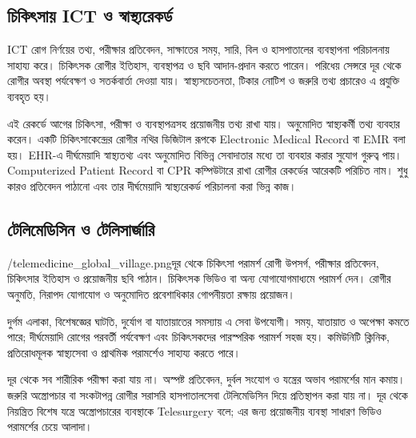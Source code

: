 \begin{topicbody}
\subsection{চিকিৎসায় ICT ও স্বাস্থ্যরেকর্ড}
ICT রোগ নির্ণয়ের তথ্য, পরীক্ষার প্রতিবেদন, সাক্ষাতের সময়, সারি, বিল ও হাসপাতালের ব্যবস্থাপনা পরিচালনায় সাহায্য করে। চিকিৎসক রোগীর ইতিহাস, ব্যবস্থাপত্র ও ছবি আদান-প্রদান করতে পারেন। পরিধেয় সেন্সরে দূর থেকে রোগীর অবস্থা পর্যবেক্ষণ ও সতর্কবার্তা দেওয়া যায়। স্বাস্থ্যসচেতনতা, টিকার নোটিশ ও জরুরি তথ্য প্রচারেও এ প্রযুক্তি ব্যবহৃত হয়।

এই রেকর্ডে আগের চিকিৎসা, পরীক্ষা ও ব্যবস্থাপত্রসহ প্রয়োজনীয় তথ্য রাখা যায়। অনুমোদিত স্বাস্থ্যকর্মী তথ্য ব্যবহার করেন। একটি চিকিৎসাকেন্দ্রের রোগীর নথির ডিজিটাল রূপকে Electronic Medical Record বা EMR বলা হয়। EHR-এ দীর্ঘমেয়াদি স্বাস্থ্যতথ্য এবং অনুমোদিত বিভিন্ন সেবাদাতার মধ্যে তা ব্যবহার করার সুযোগ গুরুত্ব পায়। Computerized Patient Record বা CPR কম্পিউটারে রাখা রোগীর রেকর্ডের আরেকটি পরিচিত নাম। শুধু কারও প্রতিবেদন পাঠানো এবং তার দীর্ঘমেয়াদি স্বাস্থ্যরেকর্ড পরিচালনা করা ভিন্ন কাজ।

\subsection{টেলিমেডিসিন ও টেলিসার্জারি}
\label{sec:ch1-telemedicine}
\begin{rightimageblock}{\chaponeimg/telemedicine_global_village.png}{দূর থেকে চিকিৎসা পরামর্শ}
রোগী উপসর্গ, পরীক্ষার প্রতিবেদন, চিকিৎসার ইতিহাস ও প্রয়োজনীয় ছবি পাঠান। চিকিৎসক ভিডিও বা অন্য যোগাযোগমাধ্যমে পরামর্শ দেন। রোগীর অনুমতি, নিরাপদ যোগাযোগ ও অনুমোদিত প্রবেশাধিকার গোপনীয়তা রক্ষায় প্রয়োজন।
\end{rightimageblock}\label{fig:ch1-pair-10}
দুর্গম এলাকা, বিশেষজ্ঞের ঘাটতি, দুর্যোগ বা যাতায়াতের সমস্যায় এ সেবা উপযোগী। সময়, যাতায়াত ও অপেক্ষা কমতে পারে; দীর্ঘমেয়াদি রোগের পরবর্তী পর্যবেক্ষণ এবং চিকিৎসকদের পারস্পরিক পরামর্শ সহজ হয়। কমিউনিটি ক্লিনিক, প্রতিরোধমূলক স্বাস্থ্যসেবা ও প্রাথমিক পরামর্শেও সাহায্য করতে পারে।

দূর থেকে সব শারীরিক পরীক্ষা করা যায় না। অস্পষ্ট প্রতিবেদন, দুর্বল সংযোগ ও যন্ত্রের অভাব পরামর্শের মান কমায়। জরুরি অস্ত্রোপচার বা সংকটাপন্ন রোগীর সরাসরি হাসপাতালসেবা টেলিমেডিসিন দিয়ে প্রতিস্থাপন করা যায় না। দূর থেকে নিয়ন্ত্রিত বিশেষ যন্ত্রে অস্ত্রোপচারের ব্যবস্থাকে Telesurgery বলে; এর জন্য প্রয়োজনীয় ব্যবস্থা সাধারণ ভিডিও পরামর্শের চেয়ে আলাদা।


\end{topicbody}

